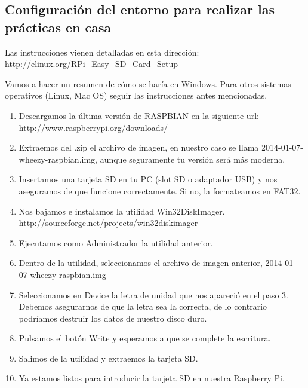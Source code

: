 \subsection{Configuración del entorno para realizar las prácticas en casa}

Las instrucciones vienen detalladas en esta dirección:\newline
\textcolor{blue}{
  \href{http://elinux.org/RPi\_Easy\_SD\_Card\_Setup}
  {http://elinux.org/RPi\_Easy\_SD\_Card\_Setup}}

Vamos a hacer un resumen de cómo se haría en Windows. Para otros
sistemas operativos (Linux, Mac OS) seguir las instrucciones antes mencionadas.

\begin{enumerate}
  \item Descargamos la última versión de RASPBIAN en la siguiente url: \newline
\hspace{2.5cm}
\textcolor{blue}{
  \href{http://www.raspberrypi.org/downloads/}
  {http://www.raspberrypi.org/downloads/}}
  \item Extraemos del .zip el archivo de imagen, en nuestro caso se llama
        2014-01-07-wheezy-raspbian.img, aunque seguramente tu versión será más moderna.
  \item Insertamos una tarjeta SD en tu PC (slot SD o adaptador USB) y nos aseguramos de que
        funcione correctamente. Si no, la formateamos en FAT32.
  \item Nos bajamos e instalamos la utilidad Win32DiskImager. \newline
\hspace{2.5cm}
\textcolor{blue}{
  \href{http://sourceforge.net/projects/win32diskimager}
  {http://sourceforge.net/projects/win32diskimager}}
  \item Ejecutamos como Administrador la utilidad anterior.
  \item Dentro de la utilidad, seleccionamos el archivo de imagen anterior,
        2014-01-07-wheezy-raspbian.img
  \item Seleccionamos en Device la letra de unidad que nos apareció en el paso 3.
        Debemos asegurarnos de que la letra sea la correcta, de lo contrario
        podríamos destruir los datos de nuestro disco duro.
  \item Pulsamos el botón Write y esperamos a que se complete la escritura.
  \item Salimos de la utilidad y extraemos la tarjeta SD.
  \item Ya estamos listos para introducir la tarjeta SD en nuestra Raspberry Pi.
\end{enumerate}

